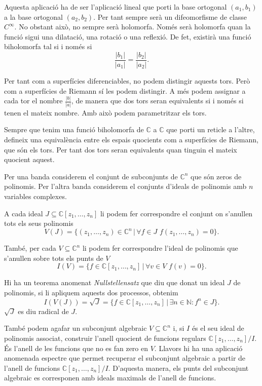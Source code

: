 \documentclass{article}
\theoremstyle{definition}
\begin{document}
Aquesta aplicaci\'{o} ha de ser l'aplicaci\'{o} lineal que porti la base ortogonal $(a_1,b_1)$ a la base ortogonal $(a_2,b_2)$. Per tant sempre ser\`{a} un difeomorfisme de classe $C^{\infty}$. No obstant aix\`{o}, no sempre ser\`{a} holomorfa. Nom\'{e}s ser\`{a} holomorfa quan la funci\'{o} sigui una dilataci\'{o}, una rotaci\'{o} o una reflexi\'{o}. De fet, existir\`{a} una funci\'{o} biholomorfa tal si i nom\'{e}s si
\[\frac{|b_1|}{|a_1|}=\frac{|b_2|}{|a_2|}.\]

Per tant com a superf\'{i}cies diferenciables, no podem distingir aquests tors. Per\`{o} com a superf\'{i}cies de Riemann s\'{i} les podem distingir. A m\'{e}s podem assignar a cada tor el nombre $\frac{|b|}{|a|}$, de manera que dos tors seran equivalents si i nom\'{e}s si tenen el mateix nombre. Amb aix\`{o} podem parametritzar els tors.

Sempre que tenim una funci\'{o} biholomorfa de $\mathbb{C}$ a $\mathbb{C}$ que porti un reticle a l'altre, defineix una equival\`{e}ncia entre els espais quocients  com a superf\'{i}cies de Riemann, que s\'{o}n els tors. Per tant dos tors seran equivalents quan tinguin el mateix quocient aquest.

Per una banda considerem el conjunt de subconjunts de $\mathbb{C}^n$ que s\'{o}n zeros de polinomis. Per l'altra banda considerem el conjunts d'ideals de polinomis amb $n$ variables complexes.

A cada ideal $J\subseteq\mathbb{C}[z_1,\ldots,z_n]$ li podem fer correspondre el conjunt on s'anul\textperiodcentered len tots els seus polinomis
\[V(J)=\{(z_1,\ldots,z_n)\in\mathbb{C}^n\,|\,\forall f\in J\,\,f(z_1,\ldots,z_n)=0\}.\]

Tamb\'{e}, per cada $V\subseteq\mathbb{C}^n$ li podem fer correspondre l'ideal de polinomis que s'anul\textperiodcentered len sobre tots els punts de $V$
\[I(V)=\{f\in\mathbb{C}[z_1,\ldots,z_n]\,|\,\forall v\in V\,\,f(v)=0\}.\]

Hi ha un teorema anomenat \emph{Nullstellensatz} que diu que donat un ideal $J$ de polinomis, si li apliquem aquests dos processos, obtenim
\[I(V(J))=\sqrt{J}=\{f\in\mathbb{C}[z_1,\ldots,z_n]\,|\,\exists n\in\mathbb{N}:f^n\in J\}.\]
$\sqrt{J}$ es diu radical de $J$.

Tamb\'{e} podem agafar un subconjunt algebraic $V\subseteq\mathbb{C}^n$ i, si $I$ \'{e}s el seu ideal de polinomis associat, construir l'anell quocient de funcions regulars $\mathbb{C}[z_1,\ldots,z_n]/I$. \'{E}s l'anell de les funcions que no es fan zero en $V$. Llavors hi ha una aplicaci\'{o} anomenada espectre que permet recuperar el subconjunt algebraic a partir de l'anell de funcions $\mathbb{C}[z_1,\ldots,z_n]/I$. D'aquesta manera, els punts del subconjunt algebraic es corresponen amb ideals maximals de l'anell de funcions.
\end{document}
